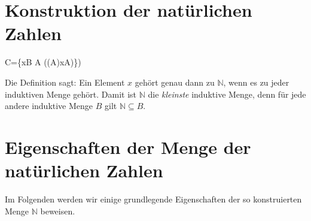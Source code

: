 \documentclass[main.tex]{subfiles}
\begin{document}
\section{Konstruktion der natürlichen Zahlen}

\begin{tabproofwide}
    {}

    {}
  \proofstepwide{}{}%
    {C=\{x\in B \mid \forall A (\Induktiv(A)\rightarrow x\in A)\})}%
    {}
\end{tabproofwide}



\begin{remark}
  Die Definition sagt: Ein Element \(x\) gehört genau dann zu \(\mathbb{N}\), wenn es zu jeder induktiven Menge gehört.  Damit ist \(\mathbb{N}\) die \emph{kleinste} induktive Menge, denn für jede andere induktive Menge \(B\) gilt \(\mathbb{N} \subseteq B\).
\end{remark}

\begin{tabproofwide}
\end{tabproofwide}

\section{Eigenschaften der Menge der natürlichen Zahlen}

Im Folgenden werden wir einige grundlegende Eigenschaften der so konstruierten Menge \(\mathbb{N}\) beweisen.
\end{document}
